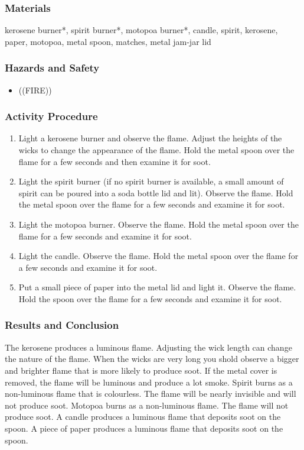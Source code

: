 \subsubsection*{Materials}
kerosene burner*, spirit burner*, motopoa burner*, candle, spirit, kerosene, paper, motopoa, metal spoon, matches, metal jam-jar lid

\subsubsection*{Hazards and Safety}
\begin{itemize}
\item{((FIRE))}
\end{itemize}

\subsubsection*{Activity Procedure}
\begin{enumerate}
\item{Light a kerosene burner and observe the flame. Adjust the heights of the wicks to change the appearance of the flame. Hold the metal spoon over the flame for a few seconds and then examine it for soot.}
\item{Light the spirit burner (if no spirit burner is available, a small amount of spirit can be poured into a soda bottle lid and lit). Observe the flame. Hold the metal spoon over the flame for a few seconds and examine it for soot.}
\item{Light the motopoa burner. Observe the flame. Hold the metal spoon over the flame for a few seconds and examine it for soot.}
\item{Light the candle. Observe the flame. Hold the metal spoon over the flame for a few seconds and examine it for soot.}
\item{Put a small piece of paper into the metal lid and light it. Observe the flame. Hold the spoon over the flame for a few seconds and examine it for soot.}
\end{enumerate}

\subsubsection*{Results and Conclusion}
The kerosene produces a luminous flame. Adjusting the wick length can change the nature of the flame. When the wicks are very long you shold observe a bigger and brighter flame that is more likely to produce soot. If the metal cover is removed, the flame will be luminous and produce a lot smoke.
Spirit burns as a non-luminous flame that is colourless. The flame will be nearly invisible and will not produce soot.
Motopoa burns as a non-luminous flame. The flame will not produce soot.
A candle produces a luminous flame that deposits soot on the spoon.
A piece of paper produces a luminous flame that deposits soot on the spoon.
